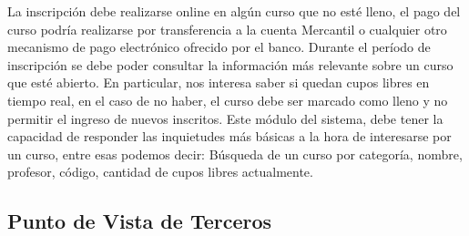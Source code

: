 \documentclass[12pt,a4paper,spanish]{article}
\begin{document}
\newline
\newline
\indent La inscripci\'on debe realizarse online en alg\'un curso
que no est\'e lleno, el pago del curso podr\'ia realizarse por
transferencia a la cuenta Mercantil o cualquier otro mecanismo de pago
electr\'onico ofrecido por el banco.
\newline
\newline
\indent Durante el per\'iodo de inscripci\'on  se debe poder
consultar la informaci\'on m\'as relevante sobre un curso que est\'e
abierto. En particular, nos interesa saber si quedan cupos libres en
tiempo real, en el caso de no haber, el curso debe ser marcado como lleno y no permitir el ingreso de nuevos inscritos. 
\newline
\newline
\indent Este m\'odulo del sistema, debe tener la capacidad de
responder las inquietudes m\'as b\'asicas a la hora de interesarse por
un curso, entre esas podemos decir: B\'usqueda de un curso por
categor\'ia, nombre, profesor, c\'odigo, cantidad de cupos libres
actualmente. 
\newline
\newline
\newpage
\subsection{Punto de Vista de Terceros}
\end{document}

